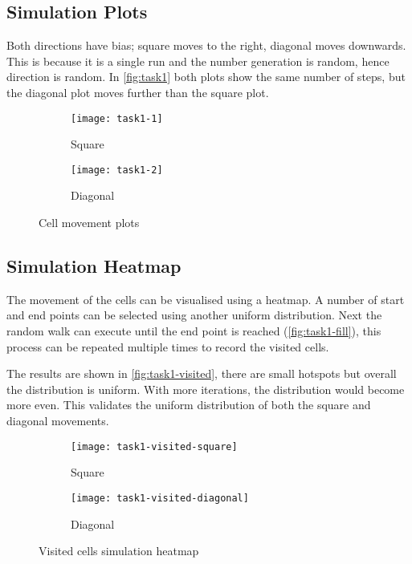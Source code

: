 \subsection{Simulation Plots}

Both directions have bias; square moves to the right, diagonal moves downwards.
This is because it is a single run and the number generation is random, hence direction is random.
In \autoref{fig:task1} both plots show the same number of steps, but the diagonal plot moves further than the square plot.

\begin{figure}[!ht]
    \centering
    \begin{subfigure}{0.4\textwidth}
    	\texttt{[image: task1-1]}
    	\caption[Square]{Square}
    	\label{fig:task1-1}
    \end{subfigure}
    \begin{subfigure}{0.4\textwidth}
    	\texttt{[image: task1-2]}
    	\caption[Diagonal]{Diagonal}
    	\label{fig:task1-2}
	\end{subfigure}
	\caption[Cell movement plots]{Cell movement plots}
    \label{fig:task1}
\end{figure}

\clearpage

\subsection{Simulation Heatmap}

The movement of the cells can be visualised using a heatmap.
A number of start and end points can be selected using another uniform distribution.
Next the random walk can execute until the end point is reached (\autoref{fig:task1-fill}),
this process can be repeated multiple times to record the visited cells.


The results are shown in \autoref{fig:task1-visited}, there are small hotspots but overall the distribution is uniform.
With more iterations, the distribution would become more even.
This validates the uniform distribution of both the square and diagonal movements.

\begin{figure}[ht]
    \centering
    \begin{subfigure}{0.45\textwidth}
        \texttt{[image: task1-visited-square]}
        \caption[Square]{Square}
        \label{fig:task1-visited-square}
    \end{subfigure}
    \begin{subfigure}{0.45\textwidth}
        \texttt{[image: task1-visited-diagonal]}
        \caption[Diagonal]{Diagonal}
        \label{fig:task1-visited-diagonal}
    \end{subfigure}
    \caption[Visited cells simulation heatmap]{Visited cells simulation heatmap}
    \label{fig:task1-visited}
\end{figure}

